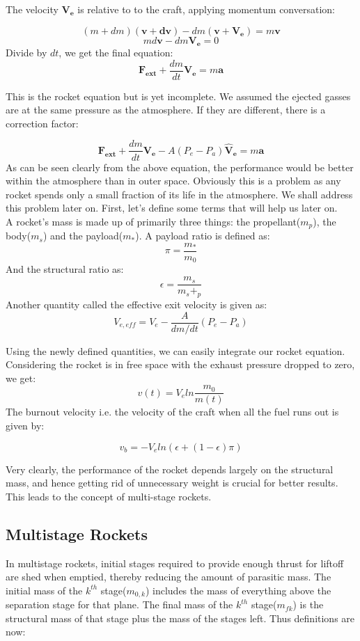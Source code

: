 \documentclass[12pt, letterpaper]{article}
\begin{document}
The velocity $\mathbf{V_e}$ is relative to to the craft, applying momentum conversation:

\[
	(m + dm)(\mathbf{v} + \mathbf{dv}) -dm(\mathbf{v} + \mathbf{V_e}) = m\mathbf{v}
\]
\[
	md\mathbf{v} -dm\mathbf{V_e} = 0
\]
Divide by $dt$, we get the final equation:
\[
	\mathbf{F_{ext}} + \frac{dm}{dt}\mathbf{V_e} = m\mathbf{a}
\]

This is the rocket equation but is yet incomplete. We assumed the ejected gasses are at the same pressure as the atmosphere. If they are different, there is a correction factor:

\[
	\mathbf{F_{ext}} + \frac{dm}{dt}\mathbf{V_e} - A(P_e - P_a)\mathbf{\hat{V}_e} = m\mathbf{a}
\]
As can be seen clearly from the above equation, the performance would be better within the atmosphere than in outer space. Obviously this is a problem as any rocket spends only a small fraction of its life in the atmosphere. We shall address this problem later on. First, let's define some terms that will help us later on.\\
A rocket's mass is made up of primarily three things: the propellant($m_p$), the body($m_s$) and the payload($m_*$). A payload ratio is defined as:
\[
	\pi = \frac{m_*}{m_0}
\]
And the structural ratio as:
\[
	\epsilon = \frac{m_s}{m_s+_p}
\]
Another quantity called the effective exit velocity is given as:
\[
	V_{e,eff} = V_e - \frac{A}{dm/dt}(P_e - P_a)
\]

Using the newly defined quantities, we can easily integrate our rocket equation. Considering the rocket is in free space with the exhaust pressure dropped to zero, we get:
\[
	v(t) = V_eln\frac{m_0}{m(t)}
\]
The burnout velocity i.e. the velocity of the craft when all the fuel runs out is given by:

\[
	v_b = -V_eln(\epsilon + (1-\epsilon) \pi)
\]

Very clearly, the performance of the rocket depends largely on the structural mass, and hence getting rid of unnecessary weight is crucial for better results. This leads to the concept of multi-stage rockets.

\subsection{Multistage Rockets}
In multistage rockets, initial stages required to provide enough thrust for liftoff are shed when emptied, thereby reducing the amount of parasitic mass. The initial mass of the $k^{th}$ stage($m_{0,k} $) includes the mass of everything above the separation stage for that plane. The final mass of the $k^{th}$ stage($m_{fk} $) is the structural mass of that stage plus the mass of the stages left. Thus definitions are now:
\end{document}
